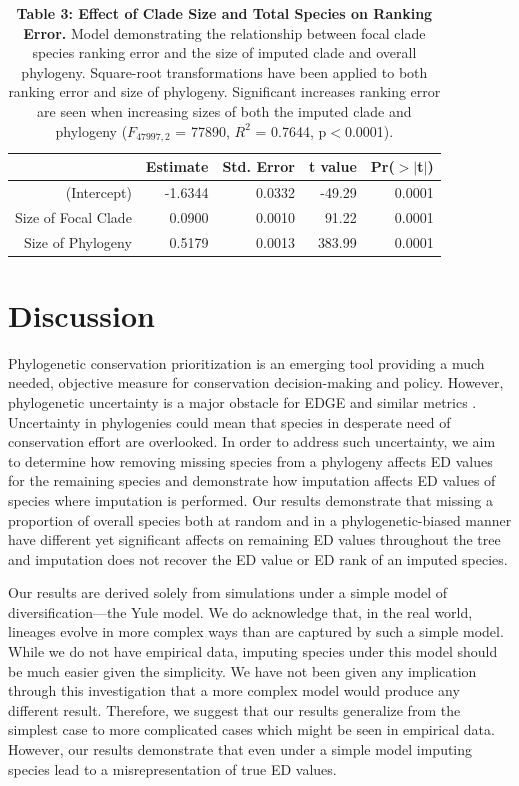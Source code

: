 \documentclass[12pt,english]{article}
\begin{document}
\begin{table}[ht]
  \centering
  \begin{tabular}{rrrrr}
    \hline
   & Estimate & Std. Error & t value & Pr($>$$|$t$|$) \\
    \hline
  (Intercept) & -1.6344 & 0.0332 & -49.29 & 0.0001 \\
    Size of Focal Clade & 0.0900 & 0.0010 & 91.22 & 0.0001 \\
    Size of Phylogeny & 0.5179 & 0.0013 & 383.99 & 0.0001 \\
     \hline
     \hline
  \end{tabular}
  \caption*{\textbf{Table 3: Effect of Clade Size and Total Species on Ranking
  Error.} Model demonstrating the relationship between focal clade species
  ranking error and the size of imputed clade and overall phylogeny. Square-root
  transformations have been applied to both ranking error and size of phylogeny.
  Significant increases ranking error are seen when increasing sizes of both the
  imputed clade and phylogeny ($F_{47997, 2}$ = 77890, $R^{2}$ = 0.7644,
  p$<$0.0001).}
  \end{table}

\clearpage
\section*{Discussion}
Phylogenetic conservation prioritization is an emerging tool providing a much
needed, objective measure for conservation decision-making and policy. However,
phylogenetic uncertainty is a major obstacle for EDGE and similar metrics
\autocite{Collen2015}. Uncertainty in phylogenies could mean that species in
desperate need of conservation effort are overlooked. In order to address such
uncertainty, we aim to determine how removing missing species from a phylogeny
affects ED values for the remaining species and demonstrate how imputation
affects ED values of species where imputation is performed. Our results
demonstrate that missing a proportion of overall species both at random and in a
phylogenetic-biased manner have different yet significant affects on remaining
ED values throughout the tree and imputation does not recover the ED value or ED
rank of an imputed species.

Our results are derived solely from simulations under a simple model of
diversification---the Yule model. We do acknowledge that, in the real world,
lineages evolve in more complex ways than are captured by such a simple model.
While we do not have empirical data, imputing species under this model should be
much easier given the simplicity. We have not been given any implication through
this investigation that a more complex model would produce any different result.
Therefore, we suggest that our results generalize from the simplest case to more
complicated cases which might be seen in empirical data. However, our results
demonstrate that even under a simple model imputing species lead to a
misrepresentation of true ED values. 
\end{document}
